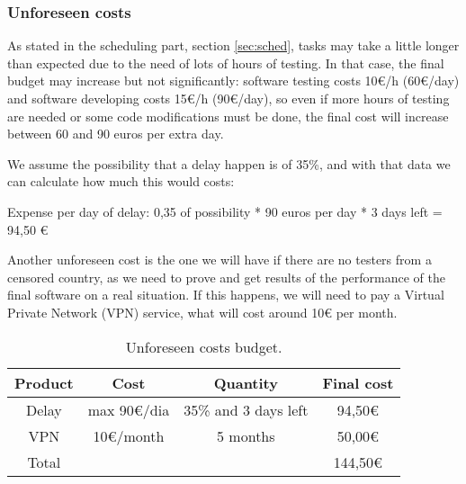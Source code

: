 \subsubsection{Unforeseen costs}
As stated in the scheduling part, section \ref{sec:sched}, tasks may take a little longer than expected due to the need of lots of hours of testing. In that case, the final budget may increase but not significantly: software testing costs 10€/h (60€/day) and software developing costs 15€/h (90€/day), so even if more hours of testing are needed or some code modifications must be done, the final cost will increase between 60 and 90 euros per extra day.

We assume the possibility that a delay happen is of 35\%, and with that data we can calculate how much this would costs:

Expense per day of delay: 0,35 of possibility * 90 euros per day * 3 days left = 94,50 €

Another unforeseen cost is the one we will have if there are no testers from a censored country, as we need to prove and get results of the performance of the final software on a real situation. If this happens, we will need to pay a Virtual Private Network (VPN) service, what will cost around 10€ per month.

\begin{table}[!htb]
\centering
  \begin{tabular}{| c | c | c | c |}
  \hline Product & Cost & Quantity & Final cost \\ \hline 
  Delay & max 90€/dia & 35\% and 3 days left & 94,50€  \\ \hline
  VPN & 10€/month & 5 months & 50,00€        \\ \hline \hline   
  Total & & & 144,50€  \\ \hline 
  \end{tabular}
  \caption{Unforeseen costs budget.} \vspace{3pt}
  \label{tab:unforeseencosts}
\end{table}